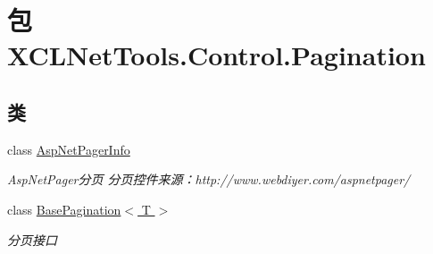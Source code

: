 \hypertarget{namespace_x_c_l_net_tools_1_1_control_1_1_pagination}{\section{包 X\-C\-L\-Net\-Tools.\-Control.\-Pagination}
\label{namespace_x_c_l_net_tools_1_1_control_1_1_pagination}
}
\subsection*{类}
\begin{DoxyCompactItemize}
\item 
class \hyperlink{class_x_c_l_net_tools_1_1_control_1_1_pagination_1_1_asp_net_pager_info}{Asp\-Net\-Pager\-Info}
\begin{DoxyCompactList}\small\item\em Asp\-Net\-Pager分页 分页控件来源：http\-://www.webdiyer.\-com/aspnetpager/ \end{DoxyCompactList}\item 
class \hyperlink{class_x_c_l_net_tools_1_1_control_1_1_pagination_1_1_base_pagination_3_01_t_01_4}{Base\-Pagination$<$ T $>$}
\begin{DoxyCompactList}\small\item\em 分页接口 \end{DoxyCompactList}\end{DoxyCompactItemize}
